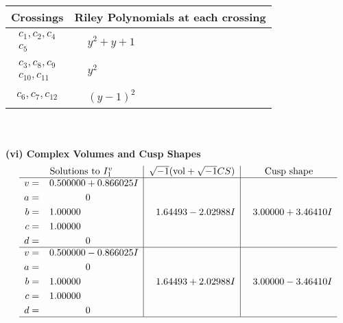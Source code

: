\documentclass[1p]{elsarticle_modified}
\theoremstyle{definition}
\newcommand{\I}{\sqrt{-1}}
\begin{document}
\begin{tabular}{m{50pt}|m{274pt}}
Crossings & \hspace{64pt}Riley Polynomials at each crossing \\
\hline $$\begin{aligned}c_{1},c_{2},c_{4}\\c_{5}\end{aligned}$$&$\begin{aligned}
&y^2+y+1
\end{aligned}$\\
\hline $$\begin{aligned}c_{3},c_{8},c_{9}\\c_{10},c_{11}\end{aligned}$$&$\begin{aligned}
&y^2
\end{aligned}$\\
\hline $$\begin{aligned}c_{6},c_{7},c_{12}\end{aligned}$$&$\begin{aligned}
&(y-1)^2
\end{aligned}$\\
\hline
\end{tabular}\\~\\
\newpage\flushleft \textbf{(vi) Complex Volumes and Cusp Shapes}
$$\begin{array}{c|c|c}  
\text{Solutions to }I^v_{1}& \I (\text{vol} + \sqrt{-1}CS) & \text{Cusp shape}\\
 \hline 
\begin{aligned}
v &= \phantom{-}0.500000 + 0.866025 I \\
a &= \phantom{-0.000000 } 0 \\
b &= \phantom{-}1.00000\phantom{ +0.000000I} \\
c &= \phantom{-}1.00000\phantom{ +0.000000I} \\
d &= \phantom{-0.000000 } 0\end{aligned}
 & \phantom{-}1.64493 - 2.02988 I & \phantom{-}3.00000 + 3.46410 I \\ \hline\begin{aligned}
v &= \phantom{-}0.500000 - 0.866025 I \\
a &= \phantom{-0.000000 } 0 \\
b &= \phantom{-}1.00000\phantom{ +0.000000I} \\
c &= \phantom{-}1.00000\phantom{ +0.000000I} \\
d &= \phantom{-0.000000 } 0\end{aligned}
 & \phantom{-}1.64493 + 2.02988 I & \phantom{-}3.00000 - 3.46410 I\\
 \hline 
 \end{array}$$\newpage\newpage\renewcommand{\arraystretch}{1}
\end{document}
